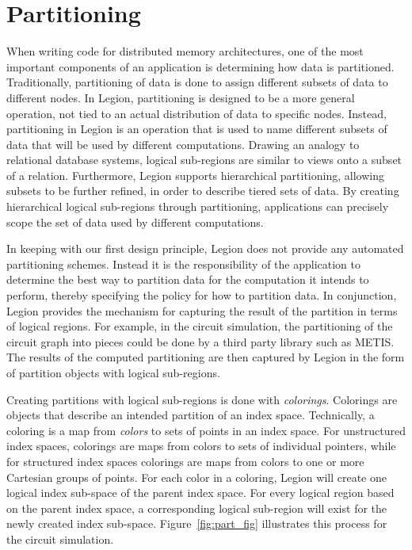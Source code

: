 \section{Partitioning}
\label{sec:partitioning}
When writing code for distributed memory architectures,
one of the most important components of an application
is determining how data is partitioned. Traditionally, 
partitioning of data is done to assign different subsets 
of data to different nodes. In Legion, partitioning 
is designed to be a more general operation, not tied to 
an actual distribution of data to specific nodes. Instead, 
partitioning in Legion is an operation that is used
to name different subsets of data that will be
used by different computations. Drawing an analogy
to relational database systems, logical sub-regions
are similar to views onto a subset of a relation.
Furthermore, Legion supports hierarchical partitioning,
allowing subsets to be further refined, in order to 
describe tiered sets of data. By creating hierarchical 
logical sub-regions through partitioning, applications 
can precisely scope the set of data used 
by different computations.

In keeping with our first design principle, Legion
does not provide any automated partitioning schemes.  
Instead it is the responsibility of the application 
to determine the best way to partition data for the 
computation it intends to perform, thereby specifying 
the policy for how to partition data.  In conjunction,
Legion provides the mechanism for capturing the result
of the partition in terms of logical regions. For example,
in the circuit simulation, the partitioning of the circuit
graph into pieces could be done by a third party library
such as METIS. The results of the computed partitioning are 
then captured by Legion in the form of partition objects
with logical sub-regions.

Creating partitions with logical sub-regions 
is done with {\em colorings}.  Colorings are objects
that describe an intended partition of an index space.
Technically, a coloring is a map from {\em colors} to sets of
points in an index space. For unstructured index spaces,
colorings are maps from colors to sets of individual pointers,
while for structured index spaces colorings are maps from
colors to one or more Cartesian groups of points. For each 
color in a coloring, Legion will create one logical index 
sub-space of the parent index space. For every logical 
region based on the parent index space, a corresponding 
logical sub-region will exist for the newly created index 
sub-space. Figure~\ref{fig:part_fig} illustrates this
process for the circuit simulation.

